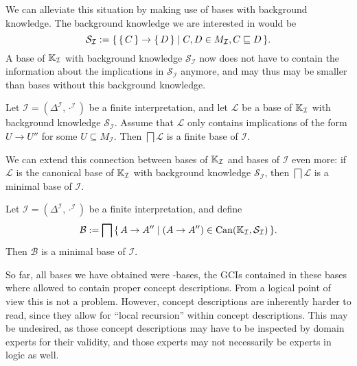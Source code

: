 We can alleviate this situation by making use of bases with background knowledge.  The
background knowledge we are interested in would be
\begin{equation}
  \label{eq:28}
  \mathcal{S}_{\mathcal{I}} := {\{\, {\{\, C \,\}} \to {\ensuremath{\{\, D \,\}}} \mid C, D \in
    M_{\mathcal{I}}, C \sqsubseteq D \,\}}.
\end{equation}
A base of ${\mathbb{K}}_{\mathcal{I}}$ with background knowledge $\mathcal{S}_{\mathcal{I}}$ now
does not have to contain the information about the implications in
$\mathcal{S}_{\mathcal{I}}$ anymore, and may thus may be smaller than bases without this
background knowledge.

\begin{Theorem}
  \label{thm:Felix-base-B3}
  Let $\mathcal{I} = (\Delta^{\mathcal{I}}, \cdot^{\mathcal{I}})$ be a finite
  interpretation, and let $\mathcal{L}$ be a base of ${\mathbb{K}}_{\mathcal{I}}$ with
  background knowledge $\mathcal{S}_{\mathcal{I}}$.  Assume that $\mathcal{L}$ only
  contains implications of the form $U \to U''$ for some $U \subseteq M_{\mathcal{I}}$.
  Then $\bigsqcap \mathcal{L}$ is a finite base of $\mathcal{I}$.
\end{Theorem}

We can extend this connection between bases of ${\mathbb{K}}_{\mathcal{I}}$ and bases of
$\mathcal{I}$ even more: if $\mathcal{L}$ is the canonical base of ${\mathbb{K}}_{\mathcal{I}}$
with background knowledge $\mathcal{S}_{\mathcal{I}}$, then $\bigsqcap \mathcal{L}$ is a
minimal base of $\mathcal{I}$.

\begin{Theorem}
  \label{thm:Felix-5.18}
  Let $\mathcal{I} = (\Delta^{\mathcal{I}}, \cdot^{\mathcal{I}})$ be a finite
  interpretation, and define
  \begin{equation*}
    \mathcal{B} := \bigsqcap {\ensuremath{\{\, A \to A'' \mid (A \to A'') \in \operatorname{Can}({\mathbb{K}}_{\mathcal{I}}, \mathcal{S}_{\mathcal{I}}) \,\}}}.
  \end{equation*}
  Then $\mathcal{B}$ is a minimal base of $\mathcal{I}$.
\end{Theorem}

So far, all bases we have obtained were \ELgfpbot-bases, \ie the GCIs contained in these
bases where allowed to contain proper \ELgfpbot concept descriptions.  From a logical
point of view this is not a problem.  However, \ELgfpbot concept descriptions are
inherently harder to read, since they allow for ``local recursion'' within concept
descriptions.  This may be undesired, as those concept descriptions may have to be
inspected by domain experts for their validity, and those experts may not necessarily be
experts in logic as well.

